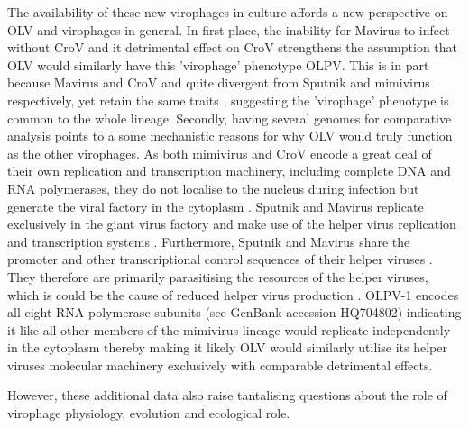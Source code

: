 The availability of these new virophages in culture affords a new perspective on \ac{OLV} and virophages in general.
In first place, the inability for Mavirus to infect without CroV and it detrimental effect on CroV strengthens the assumption that OLV would similarly have this 'virophage' phenotype \ac{OLPV}.
This is in part because Mavirus and CroV and quite divergent from Sputnik and mimivirus respectively, yet retain the same traits \cite{Fischer2010, Fischer2011}, suggesting the 'virophage' phenotype is common to the whole lineage.
Secondly, having several genomes for comparative analysis points to a some mechanistic reasons for why \ac{OLV} would truly function as the other virophages.
As both mimivirus and CroV encode a great deal of their own replication and transcription machinery, including complete \textsc{DNA} and \textsc{RNA} polymerases, they do not localise to the nucleus during infection but generate the viral factory in the cytoplasm \cite{LaScola2008, Fischer2011}.
Sputnik and Mavirus replicate exclusively in the giant virus factory and make use of the helper virus replication and transcription systems \cite{LaScola2008, Fischer2011}.
Furthermore, Sputnik and Mavirus share the promoter and other transcriptional control sequences of their helper viruses \cite{Claverie2009, Fischer2011}.
They therefore are primarily parasitising the resources of the helper viruses, which is could be the cause of reduced helper virus production \cite{Claverie2009, Fischer2012}.
\ac{OLPV}-1 encodes all eight \textsc{RNA} polymerase subunits (see GenBank accession HQ704802) indicating it like all other members of the mimivirus lineage would replicate independently in the cytoplasm thereby making it likely \ac{OLV} would similarly utilise its helper viruses molecular machinery exclusively with comparable detrimental effects.

 

However, these additional data also raise tantalising questions about the role of virophage physiology, evolution and ecological role.



